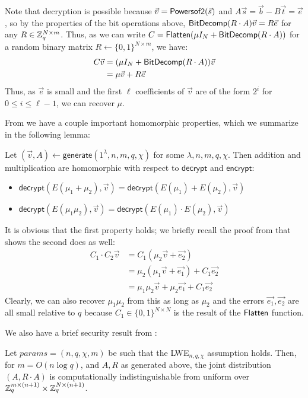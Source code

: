 Note that decryption is possible because $\vec{v} = \mathsf{Powersof2}(\vec{s})$ and $A\vec{s} = \vec{b} - B\vec{t} = \vec{e}$, so by the properties of the bit operations above, $\mathsf{BitDecomp}(R\cdot A)\vec{v} = R\vec{e}$ for any $R \in \mathbb{Z}_q^{N \times m}$.  Thus, as we can write $C = \mathsf{Flatten}(\mu I_N + \mathsf{BitDecomp}(R\cdot A))$ for a random binary matrix $R \leftarrow \{0,1\}^{N\times m}$, we have:
\begin{align*}
C\vec{v} &= (\mu I_N + \mathsf{BitDecomp}(R\cdot A))\vec{v}\\
&= \mu \vec{v} + R\vec{e}
\end{align*}
Thus, as $\vec{e}$ is small and the first $\ell$ coefficients of $\vec{v}$ are of the form $2^i$ for $0 \leq i \leq \ell-1$, we can recover $\mu$.

From \cite{gsw} we have a couple important homomorphic properties, which we summarize in the following lemma:

\begin{lemma}
\label{gswprop}
Let $(\vec{v}, A) \leftarrow \mathsf{generate}(1^\lambda, n, m, q, \chi)$ for some $\lambda, n, m, q, \chi$.  Then addition and multiplication are homomorphic with respect to $\mathsf{decrypt}$ and $\mathsf{encrypt}$:
\begin{itemize}
\item $\mathsf{decrypt}(E(\mu_1 + \mu_2), \vec{v}) = \mathsf{decrypt}(E(\mu_1) + E(\mu_2), \vec{v})$
\item $\mathsf{decrypt}(E(\mu_1\mu_2), \vec{v}) = \mathsf{decrypt}(E(\mu_1)\cdot E(\mu_2), \vec{v})$
\end{itemize}
\end{lemma}

It is obvious that the first property holds; we briefly recall the proof from \cite{gsw} that shows the second does as well:
\begin{align*}
C_1\cdot C_2\vec{v} &= C_1(\mu_2\vec{v} + \vec{e_2})\\
&= \mu_2(\mu_1\vec{v} + \vec{e_1}) + C_1\vec{e_2}\\
&= \mu_1\mu_2\vec{v} + \mu_2\vec{e_1} + C_1\vec{e_2}
\end{align*}
Clearly, we can also recover $\mu_1\mu_2$ from this as long as $\mu_2$ and the errors $\vec{e_1}, \vec{e_2}$ are all small relative to $q$ because $C_1 \in \{0,1\}^{N\times N}$ is the result of the $\mathsf{Flatten}$ function.

We also have a brief security result from \cite{gsw,reg05}:

\begin{lemma}
\label{gswsec}
Let $params = (n,q,\chi,m)$ be such that the LWE$_{n,q,\chi}$ assumption holds.  Then, for $m = O(n\log q)$, and $A, R$ as generated above, the joint distribution $(A, R\cdot A)$ is computationally indistinguishable from uniform over $\mathbb{Z}_q^{m \times (n+1)} \times \mathbb{Z}_q^{N \times (n+1)}$.
\end{lemma}
